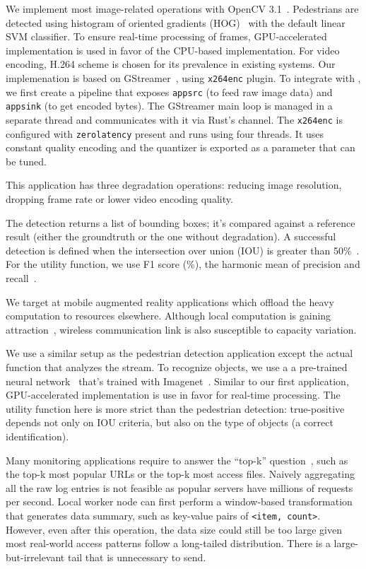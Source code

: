 We implement most image-related operations with OpenCV
3.1~\cite{opencvlibrary}. Pedestrians are detected using histogram of oriented
gradients (HOG)~\cite{dalal2005histograms} with the default linear SVM
classifier. To ensure real-time processing of frames, GPU-accelerated
implementation is used in favor of the CPU-based implementation. For video
encoding, H.264 scheme is chosen for its prevalence in existing systems. Our
implemenation is based on GStreamer~\cite{gstreamer}, using \texttt{x264enc}
plugin. To integrate with \sysname{}, we first create a pipeline that exposes
\texttt{appsrc} (to feed raw image data) and \texttt{appsink} (to get encoded
bytes). The GStreamer main loop is managed in a separate thread and \sysname{}
communicates with it via Rust's channel. The \texttt{x264enc} is configured with
\texttt{zerolatency} present and runs using four threads. It uses constant
quality encoding and the quantizer is exported as a parameter that can be tuned.

This application has three degradation operations: reducing image resolution,
dropping frame rate or lower video encoding quality.

The detection returns a list of bounding boxes; it's compared against a
reference result (either the groundtruth or the one without degradation). A
successful detection is defined when the intersection over union (IOU) is
greater than 50\%~\cite{everingham2010pascal}. For the utility function, we use
F1 score (\%), the harmonic mean of precision and
recall~\cite{Rijsbergen:1979:IR:539927}.

 We target at mobile augmented reality applications
which offload the heavy computation to resources elsewhere. Although local
computation is gaining attraction~\cite{satyanarayanan2009case, zhang2015cloud},
wireless communication link is also susceptible to capacity variation.

We use a similar setup as the pedestrian detection application except the actual
function that analyzes the stream. To recognize objects, we use a a pre-trained
neural network~\cite{darknet13} that's trained with
Imagenet~\cite{krizhevsky2012imagenet}. Similar to our first application,
GPU-accelerated implementation is use in favor for real-time processing. The
utility function here is more strict than the pedestrian detection:
true-positive depends not only on IOU criteria, but also on the type of objects
(a correct identification).

 Many monitoring applications require to answer the
``top-k'' question~\cite{babcock2003distributed}, such as the top-k most popular
URLs or the top-k most access files. Naively aggregating all the raw log entries
is not feasible as popular servers have millions of requests per second. Local
worker node can first perform a window-based transformation that generates data
summary, such as key-value pairs of \texttt{<item, count>}. However, even after
this operation, the data size could still be too large given most real-world
access patterns follow a long-tailed distribution. There is a
large-but-irrelevant tail that is unnecessary to send.

